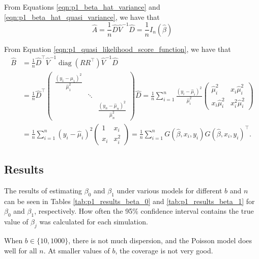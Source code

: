 \documentclass[letterpaper,11pt]{article}
\begin{document}
\begin{enumerate}
\begin{description}
    From Equations \ref{eqn:p1_beta_hat_variance} and
    \ref{eqn:p1_beta_hat_quasi_variance}, we have that
    \begin{equation}
      \hat{A} = \frac{1}{n}\hat{D}\hat{V}^{-1}\hat{D} = \frac{1}{n}I_n\left(\hat{\beta}\right)
    \end{equation}

    From Equation \ref{eqn:p1_quasi_likelihood_score_function}, we have that
    \begin{align}
      \hat{B}
      &= \frac{1}{n}
        \hat{D}^\intercal\hat{V}^{-1}\operatorname{diag}\left(RR^\intercal\right)\hat{V}^{-1}\hat{D}
      \nonumber\\
      &= \frac{1}{n}\hat{D}^\intercal\begin{pmatrix}
        \frac{\left(y_1 - \hat{\mu}_1\right)^2}{\hat{\mu}_1^2} & & \\
        & \ddots &\\
        & &\frac{\left(y_n - \hat{\mu}_n\right)^2}{\hat{\mu}_n^2}
      \end{pmatrix}\hat{D} =
            \frac{1}{n}\sum_{i=1}^n \frac{\left(y_i - \hat{\mu}_i\right)^2}{\hat{\mu}_i^2}
      \begin{pmatrix}
        \hat{\mu}_i^2 & x_i\hat{\mu}_i^2 \\
        x_i\hat{\mu}_i^2 & x_i^2\hat{\mu}_i^2
      \end{pmatrix} \nonumber\\
      &= \frac{1}{n}\sum_{i=1}^n\left(y_i-\hat{\mu}_i\right)^2
        \begin{pmatrix}
          1 & x_i\\
          x_i & x_i^2
        \end{pmatrix} = \frac{1}{n}\sum_{i=1}^n
                G\left(\hat{\beta},x_i,y_i\right)G\left(\hat{\beta},x_i,y_i\right)^\intercal.
    \end{align}

    \subsection*{Results}

    The results of estimating $\beta_0$ and $\beta_1$ under various models for
    different $b$ and $n$ can be seen in Tables \ref{tab:p1_results_beta_0} and
    \ref{tab:p1_results_beta_1} for $\beta_0$ and $\beta_1$, respectively. How
    often the 95\% confidence interval contains the true value of $\beta_j$ was
    calculated for each simulation.

    When $b \in \{10,1000\}$, there is not much dispersion, and the Poisson
    model does well for all $n$. At smaller values of $b$, the coverage is not
    very good.


\end{description}
\end{enumerate}
\end{document}

